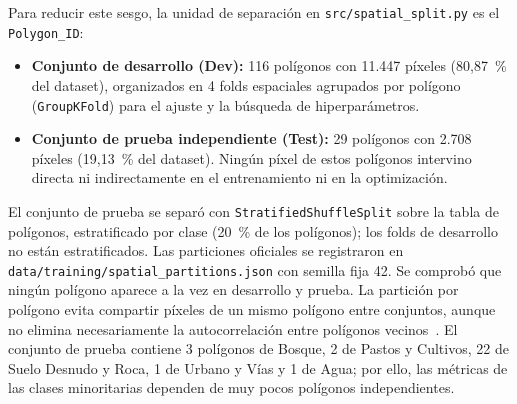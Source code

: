 \documentclass[11pt,a4paper]{article}
\begin{document}
Para reducir este sesgo, la unidad de separación en \texttt{src/spatial\_split.py} es el \texttt{Polygon\_ID}:
\begin{itemize}[noitemsep,topsep=2pt]
    \item \textbf{Conjunto de desarrollo (Dev):} 116 polígonos con 11.447 píxeles (80,87~\% del dataset), organizados en 4 folds espaciales agrupados por polígono (\texttt{GroupKFold}) para el ajuste y la búsqueda de hiperparámetros.
    \item \textbf{Conjunto de prueba independiente (Test):} 29 polígonos con 2.708 píxeles (19,13~\% del dataset). Ningún píxel de estos polígonos intervino directa ni indirectamente en el entrenamiento ni en la optimización.
\end{itemize}
El conjunto de prueba se separó con \texttt{StratifiedShuffleSplit} sobre la tabla de polígonos, estratificado por clase (20~\% de los polígonos); los folds de desarrollo no están estratificados. Las particiones oficiales se registraron en \texttt{data/training/spatial\_partitions.json} con semilla fija 42. Se comprobó que ningún polígono aparece a la vez en desarrollo y prueba. La partición por polígono evita compartir píxeles de un mismo polígono entre conjuntos, aunque no elimina necesariamente la autocorrelación entre polígonos vecinos~\cite{roberts2017}. El conjunto de prueba contiene 3 polígonos de Bosque, 2 de Pastos y Cultivos, 22 de Suelo Desnudo y Roca, 1 de Urbano y Vías y 1 de Agua; por ello, las métricas de las clases minoritarias dependen de muy pocos polígonos independientes.

\begin{table}[H]
\centering
\small
{}
\caption{Distribución por clase y partición espacial en \texttt{dataset.tsv}.}
\label{tab:clases_particion}
\end{table}
\end{document}
